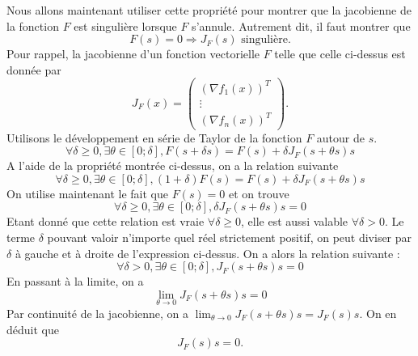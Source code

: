 Nous allons maintenant utiliser cette propriété pour montrer que la jacobienne de la fonction $F$ est singulière lorsque $F$ s'annule. Autrement dit, il faut montrer que $$F(s) = 0 \Rightarrow J_{F}(s) \text{ singulière}.$$
Pour rappel, la jacobienne d'un fonction vectorielle $F$ telle que celle ci-dessus est donnée par 
$$J_F(x) =
\left(\begin{array}{c}
(\nabla f_1(x))^T \\
\vdots \\
(\nabla f_n(x))^T
\end{array}\right).$$
Utilisons le développement en série de Taylor de la fonction $F$ autour de $s$.\\
$$\forall \delta \geq 0, \exists \theta \in [0;\delta], F(s+\delta s) = F(s) + \delta J_F(s+\theta s)s$$
A l'aide de la propriété montrée ci-dessus, on a la relation suivante  $$\forall \delta \geq 0, \exists \theta \in [0;\delta], (1+\delta)F(s) = F(s) + \delta J_F(s+\theta s)s$$
On utilise maintenant le fait que $F(s) = 0$ et on trouve $$\forall \delta \geq 0, \exists \theta \in [0;\delta], \delta J_F(s+\theta s)s = 0$$
Etant donné que cette relation est vraie $\forall \delta \geq 0$, elle est aussi valable $\forall \delta > 0$. Le terme $\delta$ pouvant valoir n'importe quel réel strictement positif, on peut diviser par $\delta$ à gauche et à droite de l'expression ci-dessus. On a alors la relation suivante :
$$\forall \delta > 0, \exists \theta \in [0;\delta], J_F(s+\theta s)s = 0$$
En passant à la limite, on a
$$\lim_{\theta \to 0} J_F(s+\theta s)s = 0$$
Par continuité de la jacobienne, on a $\lim_{\theta \to 0} J_F(s+\theta s)s = J_F(s)s$.
On en déduit que $$J_F(s)s = 0.$$
